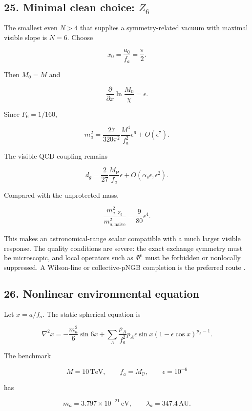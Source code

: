 \documentclass[
]{article}
\begin{document}
\subsection{\texorpdfstring{25. Minimal clean choice:
\(Z_6\)}{25. Minimal clean choice: Z\_6}}\label{minimal-clean-choice-z_6}

The smallest even \(N>4\) that supplies a symmetry-related vacuum with
maximal visible slope is \(N=6\). Choose

\[
x_0=\frac{a_0}{f_a}=\frac\pi2.
\]

Then \(M_0=M\) and

\[
\frac{\partial}{\partial x}
\ln\frac{M_0}{\chi}=\epsilon.
\]

Since \(F_6=1/160\),

\[
\boxed{
m_a^2
=\frac{27}{320\pi^2}
\frac{M^4}{f_a^2}\epsilon^6+O(\epsilon^7).
}
\]

The visible QCD coupling remains

\[
\boxed{
d_g=\frac{2}{27}\frac{M_{\mathrm{P}}}{f_a}\epsilon
+O(\alpha_s\epsilon,\epsilon^2).
}
\]

Compared with the unprotected mass,

\[
\boxed{
\frac{m_{a,Z_6}^2}{m_{a,\mathrm{naive}}^2}
=\frac9{80}\epsilon^4.
}
\]

This makes an astronomical-range scalar compatible with a much larger
visible response. The quality conditions are severe: the exact exchange
symmetry must be microscopic, and local operators such as \(\Phi^6\)
must be forbidden or nonlocally suppressed. A Wilson-line or
collective-pNGB completion is the preferred route
.

\subsection{26. Nonlinear environmental
equation}\label{nonlinear-environmental-equation}

Let \(x=a/f_a\). The static spherical equation is

\[
\nabla^2x
=-\frac{m_a^2}{6}\sin6x
+\sum_A\frac{\rho_A}{f_a^2}
 p_A\epsilon\sin x
 (1-\epsilon\cos x)^{p_A-1}.
\]

The benchmark

\[
M=10\,\mathrm{TeV},
\qquad
f_a=M_{\mathrm{P}},
\qquad
\epsilon=10^{-6}
\]

has

\[
m_a=3.797\times10^{-21}\,\mathrm{eV},
\qquad
\lambda_a=347.4\,\mathrm{AU}.
\]
\end{document}
